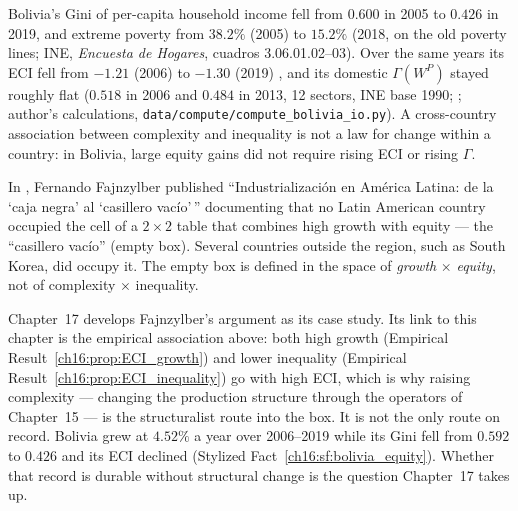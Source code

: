 \documentclass[../structural_economics_book.tex]{subfiles}
\begin{document}
\begin{stylizedfact}\label{ch16:sf:bolivia_equity}
Bolivia's Gini of per-capita household income fell from $0.600$ in 2005 to $0.426$ in 2019, and extreme poverty from $38.2\%$ (2005) to $15.2\%$ (2018, on the old poverty lines; INE, \textit{Encuesta de Hogares}, cuadros 3.06.01.02--03). Over the same years its ECI fell from $-1.21$ (2006) to $-1.30$ (2019) \citep{growthlab2026atlas}, and its domestic $\Gamma(W^P)$ stayed roughly flat ($0.518$ in 2006 and $0.484$ in 2013, 12 sectors, INE base 1990; \citealt{ine2026sut}; author's calculations, \texttt{data/compute/compute\_bolivia\_io.py}). A cross-country association between complexity and inequality is not a law for change within a country: in Bolivia, large equity gains did not require rising ECI or rising $\Gamma$.
\end{stylizedfact}

\begin{prebisch}
In \citeyear{fajnzylber1990industrializacion}, Fernando Fajnzylber published ``Industrializaci\'{o}n en Am\'{e}rica Latina: de la `caja negra' al `casillero vac\'{i}o'\,'' documenting that no Latin American country occupied the cell of a $2 \times 2$ table that combines high growth with equity --- the ``casillero vac\'{i}o'' (empty box). Several countries outside the region, such as South Korea, did occupy it. The empty box is defined in the space of \emph{growth} $\times$ \emph{equity}, not of complexity $\times$ inequality.

Chapter~17 develops Fajnzylber's argument as its case study. Its link to this chapter is the empirical association above: both high growth (Empirical Result~\ref{ch16:prop:ECI_growth}) and lower inequality (Empirical Result~\ref{ch16:prop:ECI_inequality}) go with high ECI, which is why raising complexity --- changing the production structure through the operators of Chapter~15 --- is the structuralist route into the box. It is not the only route on record. Bolivia grew at $4.52\%$ a year over 2006--2019 \citep{worldbank2026wdi} while its Gini fell from $0.592$ to $0.426$ and its ECI declined (Stylized Fact~\ref{ch16:sf:bolivia_equity}). Whether that record is durable without structural change is the question Chapter~17 takes up.
\end{prebisch}
\end{document}
